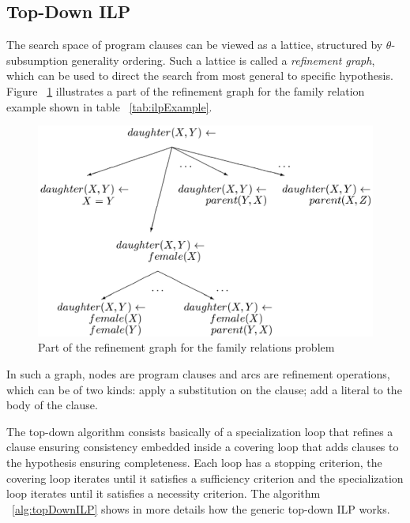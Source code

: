\subsection{Top-Down ILP}

The search space of program clauses can be viewed as a lattice, structured by $\theta$-subsumption generality
ordering. Such a lattice is called a \emph{refinement graph}, which can be used to direct the search from most general
to specific hypothesis. Figure ~\ref{fig:refinementGraph} illustrates a part of the refinement graph for the
family relation example shown in table ~\ref{tab:ilpExample}.

\begin{figure}[h!]
\label{fig:refinementGraph}
\begin{center}
  \includegraphics[width=0.7\linewidth]{./Figures/refinementGraph.png}
\end{center}
\caption{Part of the refinement graph for the family relations problem}
\end{figure}

In such a graph, nodes are program clauses and arcs are refinement operations, which can be of two kinds: apply
a substitution on the clause; add a literal to the body of the clause.

The top-down algorithm consists basically of a specialization loop that refines a clause ensuring consistency
embedded inside a covering loop that adds clauses to the hypothesis ensuring completeness. Each loop has a stopping
criterion, the covering loop iterates until it satisfies a sufficiency criterion and the specialization loop iterates
until it satisfies a necessity criterion. The algorithm ~\ref{alg:topDownILP} shows in more details how the generic
top-down ILP works.

